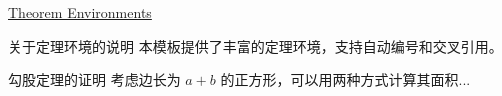\documentclass[11pt,aspectratio=43,xcolor={dvipsnames},hyperref={pdftex,pdfpagemode=UseNone,hidelinks,pdfdisplaydoctitle=true},usepdftitle=false]{ctexbeamer}
\begin{document}
\begin{frame}{\underline{Theorem Environments}}
  \begin{chdremark}{关于定理环境的说明}
    本模板提供了丰富的定理环境，支持自动编号和交叉引用。
  \end{chdremark}
  \begin{chdproof}{勾股定理的证明}
    考虑边长为 $a+b$ 的正方形，可以用两种方式计算其面积...
  \end{chdproof}
\end{frame}

\begin{frame}
  \begin{center}
    \Huge{}
  \end{center}
\end{frame}
\end{document}

